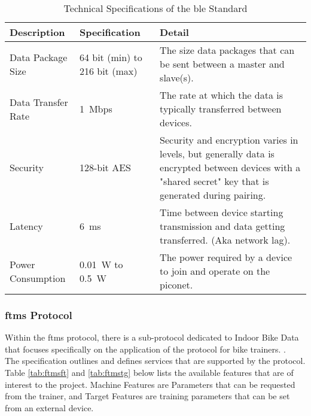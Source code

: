 \begin{table}[H]
	\centering
	\caption{Technical Specifications of the \ac{ble} Standard}
	\begin{tabularx}{\textwidth}{>{\raggedright}p{2.5cm} >{\raggedright}p{2.5cm} >{\raggedright\arraybackslash}X}
		\toprule
		Description        & Specification                       & Detail                                                                                                                                                 \\
		\midrule
		Data Package Size  & 64 bit (min) to 216 bit (max)       & The size data packages that can be sent between a master and slave(s).                                                                                 \\
		Data Transfer Rate & \SI{1}{Mbps}                        & The rate at which the data is typically transferred between devices.                                                                                   \\
		Security           & 128-bit AES                         & Security and encryption varies in levels, but generally data is encrypted between devices with a "shared secret" key that is generated during pairing. \\
		Latency            & \SI{6}{\milli\second}               & Time between device starting transmission and data getting transferred. (Aka network lag).                                                             \\
		Power Consumption  & \SI{0.01}{\watt} to \SI{0.5}{\watt} & The power required by a device to join and operate on the piconet.                                                                                     \\
		\bottomrule
	\end{tabularx}
	\label{tab:ble}
\end{table}

\subsubsection{\ac{ftms} Protocol}\label{sec:ftms}
Within the \ac{ftms} protocol, there is a sub-protocol dedicated to Indoor Bike Data that focuses specifically on the application of the protocol for bike trainers. \cite[section ~4.9]{BLSIG:2017}.\\
The specification outlines and defines services that are supported by the protocol. Table \ref{tab:ftmsft} and \ref{tab:ftmstg} below lists the available features that are of interest to the project. Machine Features are Parameters that can be requested from the trainer, and Target Features are training parameters that can be set from an external device. \citep{BLSIG:2017}

